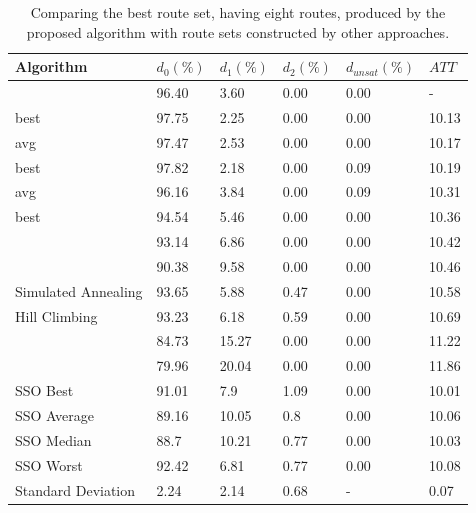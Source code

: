     \begin{table}[H]
    \centering
    \hspace*{-1.0cm}
    \begin{tabular}{|l||l|l|l|l|l|}
    \hline
    Algorithm & $d_0(\%)$ & $d_1(\%)$ & $d_2(\%)$ & $d_{unsat}(\%)$ & $ATT$ \\
    \hline
    \citet{nikolic14} & 96.40 & 3.60 & 0.00 & 0.00 & - \\
    \citet{kechagiopoulos14} best & 97.75 & 2.25 & 0.00 & 0.00 & 10.13 \\
    \citet{kechagiopoulos14} avg & 97.47 & 2.53 & 0.00 & 0.00 & 10.17 \\
    \citet{chew12} best & 97.82 & 2.18 & 0.00 & 0.09 & 10.19 \\
    \citet{chew12} avg & 96.16 & 3.84 & 0.00 & 0.09 & 10.31 \\
    \citet{fan10} best & 94.54 & 5.46 & 0.00 & 0.00 & 10.36 \\
    \citet{zhang10} & 93.14 & 6.86 & 0.00 & 0.00 & 10.42 \\
    \citet{chakroborty02} & 90.38 & 9.58 & 0.00 & 0.00 & 10.46 \\
    \citet{fan10} Simulated Annealing & 93.65 & 5.88 & 0.47 & 0.00 & 10.58 \\
    \citet{fan10} Hill Climbing & 93.23 & 6.18 & 0.59 & 0.00 & 10.69 \\
    \citet{kidwai98} & 84.73 & 15.27 & 0.00 & 0.00 & 11.22 \\
    \citet{baaj91} & 79.96 & 20.04 & 0.00 & 0.00 & 11.86 \\ 
    \hline
    SSO Best & 91.01 & 7.9 & 1.09 & 0.00 & 10.01\\
    SSO Average & 89.16 & 10.05 & 0.8 & 0.00 & 10.06\\
    SSO Median & 88.7 & 10.21 & 0.77 & 0.00 & 10.03\\
    SSO Worst & 92.42 & 6.81 & 0.77 & 0.00 & 10.08\\
    Standard Deviation & 2.24 & 2.14 & 0.68 & - & 0.07\\
    \hline
    \end{tabular}
    \caption {Comparing the best route set, having eight routes, produced by the proposed algorithm with route sets constructed by other approaches.}
    \label{table:performanceComparison_8}
    \end{table}


